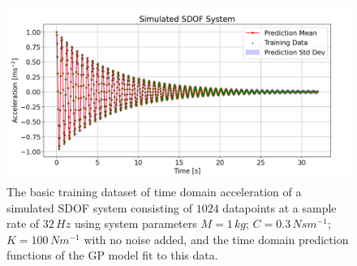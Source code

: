 \documentclass[12pt]{article}
\begin{document}
    \begin{figure}[ht]
        \centering
        \includegraphics[width=1.0\linewidth]{figures/basic-data-time-domain/basic-data-time-domain.png}
        \caption{The basic training dataset of time domain acceleration of a simulated SDOF system consisting of $1024$ datapoints at a sample rate of $32 \, Hz$ using system parameters $M = 1 \, kg$; $C = 0.3 \, Nsm^{-1}$; $K = 100 \, Nm^{-1}$ with no noise added, and the time domain prediction functions of the GP model fit to this data.}
        \label{fig:basic-data-time-domain}
    \end{figure}
\end{document}
